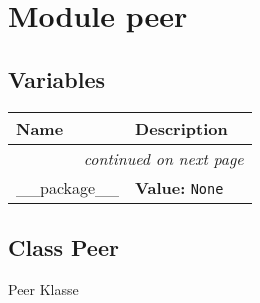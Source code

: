 %
%
%


\section{Module peer}

    \label{peer}


  \subsection{Variables}

    \vspace{-1cm}
\hspace{\varindent}\begin{longtable}{|p{\varnamewidth}|p{\vardescrwidth}|l}
\cline{1-2}
\cline{1-2} \centering \textbf{Name} & \centering \textbf{Description}& \\
\cline{1-2}
\endhead\cline{1-2}\multicolumn{3}{r}{\small\textit{continued on next page}}\\\endfoot\cline{1-2}
\endlastfoot\raggedright \_\-\_\-p\-a\-c\-k\-a\-g\-e\-\_\-\_\- & \raggedright \textbf{Value:} 
{\tt None}&\\
\cline{1-2}
\end{longtable}



\subsection{Class Peer}

    \label{peer:Peer}
Peer Klasse


